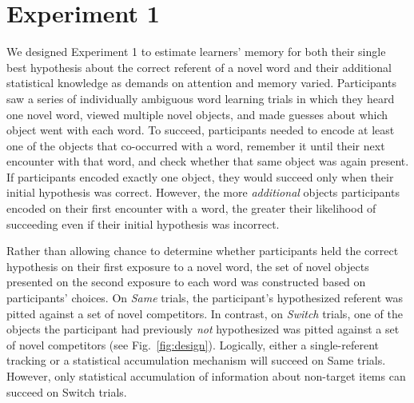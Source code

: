 \documentclass[man,floatsintext]{apa6}
\begin{document}
\vspace{-6pt}

\section{Experiment 1}

We designed Experiment 1 to estimate learners' memory for both their single best hypothesis about the correct referent of a novel word and their additional statistical knowledge as demands on attention and memory varied. Participants saw a series of individually ambiguous word learning trials in which they heard one novel word, viewed multiple novel objects, and made guesses about which object went with each word. To succeed, participants needed to encode at least one of the objects that co-occurred with a word, remember it until their next encounter with that word, and check whether that same object was again present. If participants encoded exactly one object, they would succeed only when their initial hypothesis was correct. However, the more \emph{additional} objects participants encoded on their first encounter with a word, the greater their likelihood of succeeding even if their initial hypothesis was incorrect. 

Rather than allowing chance to determine whether participants held the correct hypothesis on their first exposure to a novel word, the set of novel objects presented on the second exposure to each word was constructed based on participants' choices. On \emph{Same} trials, the participant's hypothesized referent was pitted against a set of novel competitors. In contrast, on \emph{Switch} trials, one of the objects the participant had previously \emph{not} hypothesized was pitted against a set of novel competitors (see Fig.~\ref{fig:design}). Logically, either a single-referent tracking or a statistical accumulation mechanism will succeed on Same trials. However, only statistical accumulation of information about non-target items can  succeed on Switch trials.
\end{document}

